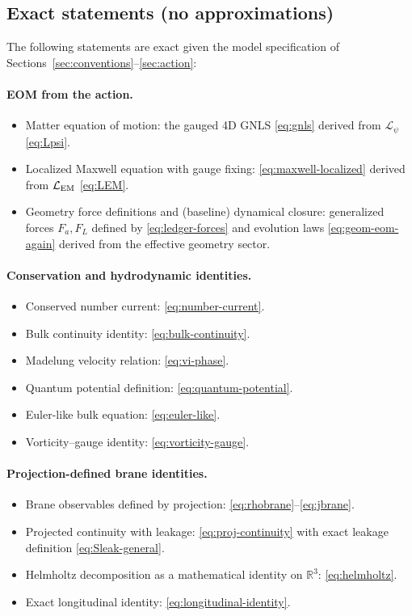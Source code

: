\documentclass[11pt]{article}
\begin{document}
\subsection{Exact statements (no approximations)}
\label{app:claims-exact}

The following statements are exact given the model specification of Sections~\ref{sec:conventions}--\ref{sec:action}:

\paragraph{EOM from the action.}
\begin{itemize}[leftmargin=2.0em]
\item Matter equation of motion: the gauged 4D GNLS \eqref{eq:gnls} derived from $\mathcal L_\psi$ \eqref{eq:Lpsi}.
\item Localized Maxwell equation with gauge fixing: \eqref{eq:maxwell-localized} derived from $\mathcal L_{\rm EM}$ \eqref{eq:LEM}.
\item Geometry force definitions and (baseline) dynamical closure: generalized forces $F_a,F_L$ defined by \eqref{eq:ledger-forces} and evolution laws \eqref{eq:geom-eom-again} derived from the effective geometry sector.
\end{itemize}

\paragraph{Conservation and hydrodynamic identities.}
\begin{itemize}[leftmargin=2.0em]
\item Conserved number current: \eqref{eq:number-current}.
\item Bulk continuity identity: \eqref{eq:bulk-continuity}.
\item Madelung velocity relation: \eqref{eq:vi-phase}.
\item Quantum potential definition: \eqref{eq:quantum-potential}.
\item Euler-like bulk equation: \eqref{eq:euler-like}.
\item Vorticity--gauge identity: \eqref{eq:vorticity-gauge}.
\end{itemize}

\paragraph{Projection-defined brane identities.}
\begin{itemize}[leftmargin=2.0em]
\item Brane observables defined by projection: \eqref{eq:rhobrane}--\eqref{eq:jbrane}.
\item Projected continuity with leakage: \eqref{eq:proj-continuity} with exact leakage definition \eqref{eq:Sleak-general}.
\item Helmholtz decomposition as a mathematical identity on $\mathbb{R}^3$: \eqref{eq:helmholtz}.
\item Exact longitudinal identity: \eqref{eq:longitudinal-identity}.
\end{itemize}
\end{document}
